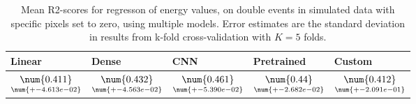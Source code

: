 \begin{table}
\centering
\caption{
Mean R2-scores for regresson of energy values, on double events in simulated data with specific pixels
set to zero, using multiple models. Error estimates are the standard deviation in results from k-fold 
cross-validation with $K=5$ folds.
}
\label{tab:regression-simulated-double-energy-pixelmod-r2}
\begin{tabular}{lllll}
\toprule
                                             Linear &                                               Dense &                                                 CNN &                                         Pretrained &                                              Custom \\
\midrule
 $\underset{\num{+- 4.613e-02 }  }{\num{ 0.411 } }$ &  $\underset{\num{+- 4.563e-02 }  }{\num{ 0.432 } }$ &  $\underset{\num{+- 5.390e-02 }  }{\num{ 0.461 } }$ &  $\underset{\num{+- 2.682e-02 }  }{\num{ 0.44 } }$ &  $\underset{\num{+- 2.091e-01 }  }{\num{ 0.412 } }$ \\
\bottomrule
\end{tabular}
\end{table}
